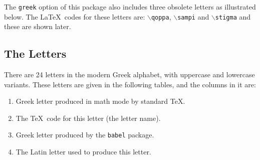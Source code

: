 The \texttt{greek} option of this package also includes three obsolete letters as illustrated below. The \LaTeX\ codes for these letters are: $\backslash$\texttt{qoppa}, $\backslash$\texttt{sampi} and $\backslash$\texttt{stigma} and these are shown later.

\subsection{The Letters}
 There are 24 letters in the modern Greek alphabet, with uppercase and lowercase variants. These letters are given in the following tables, and the columns in it are:
\begin{enumerate}
	\item Greek letter produced in math mode by standard \TeX.
	\item The \TeX\ code for this letter (the letter name).
	\item Greek letter produced by the \texttt{babel} package.
	\item The Latin letter used to produce this letter.
\end{enumerate}

